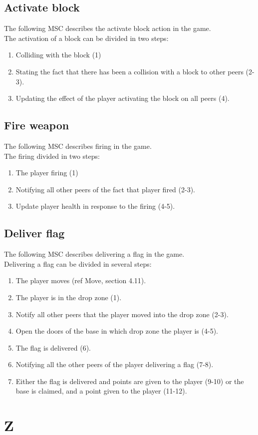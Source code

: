 \documentclass[a4paper,twoside,11pt]{article}
\begin{document}
\subsection{Activate block}
The following MSC describes the activate block action in the game.\\
The activation of a block can be divided in two steps:
\begin{enumerate}
\item Colliding with the block (1)
\item Stating the fact that there has been a collision with a block to other peers (2-3).
\item Updating the effect of the player activating the block on all peers (4).
\end{enumerate}

\subsection{Fire weapon}
The following MSC describes firing in the game.\\
The firing divided in two steps:
\begin{enumerate}
\item The player firing (1)
\item Notifying all other peers of the fact that player fired (2-3).
\item Update player health in response to the firing (4-5).
\end{enumerate}

\subsection{Deliver flag}
The following MSC describes delivering a flag in the game.\\
Delivering a flag can be divided in several steps:
\begin{enumerate}
\item The player moves (ref Move, section 4.11).
\item The player is in the drop zone (1).
\item Notify all other peers that the player moved into the drop zone (2-3).
\item Open the doors of the base in which drop zone the player is (4-5).
\item The flag is delivered (6).
\item Notifying all the other peers of the player delivering a flag (7-8).
\item Either the flag is delivered and points are given to the player (9-10) or the base is claimed, and a point given to the player (11-12).  
\end{enumerate}

\section{Z}
\end{document}
